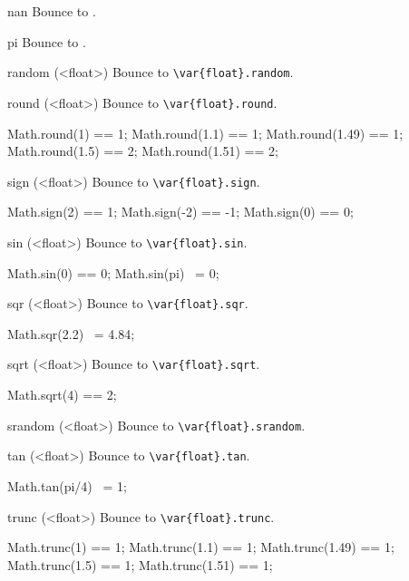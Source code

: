 \begin{urbiscriptapi}
\item[nan]
  Bounce to .

\item[pi]
  Bounce to .

\item[random](<float>)%
  Bounce to \lstinline|\var{float}.random|.

\item[round](<float>)%
  Bounce to \lstinline|\var{float}.round|.
\begin{urbiassert}
Math.round(1) == 1;
Math.round(1.1) == 1;
Math.round(1.49) == 1;
Math.round(1.5) == 2;
Math.round(1.51) == 2;
\end{urbiassert}

\item[sign](<float>)%
  Bounce to \lstinline|\var{float}.sign|.
\begin{urbiassert}
Math.sign(2)  == 1;
Math.sign(-2) == -1;
Math.sign(0)  == 0;
\end{urbiassert}

\item[sin](<float>)%
  Bounce to \lstinline|\var{float}.sin|.
\begin{urbiassert}
Math.sin(0) == 0;
Math.sin(pi) ~= 0;
\end{urbiassert}

\item[sqr](<float>)%
  Bounce to \lstinline|\var{float}.sqr|.
\begin{urbiassert}
Math.sqr(2.2) ~= 4.84;
\end{urbiassert}

\item[sqrt](<float>)%
  Bounce to \lstinline|\var{float}.sqrt|.
\begin{urbiassert}
Math.sqrt(4) == 2;
\end{urbiassert}

\item[srandom](<float>)%
  Bounce to \lstinline|\var{float}.srandom|.

\item[tan](<float>)%
  Bounce to \lstinline|\var{float}.tan|.
\begin{urbiassert}
Math.tan(pi/4) ~= 1;
\end{urbiassert}

\item[trunc](<float>)%
  Bounce to \lstinline|\var{float}.trunc|.
\begin{urbiassert}
Math.trunc(1) == 1;
Math.trunc(1.1) == 1;
Math.trunc(1.49) == 1;
Math.trunc(1.5) == 1;
Math.trunc(1.51) == 1;
\end{urbiassert}
\end{urbiscriptapi}


